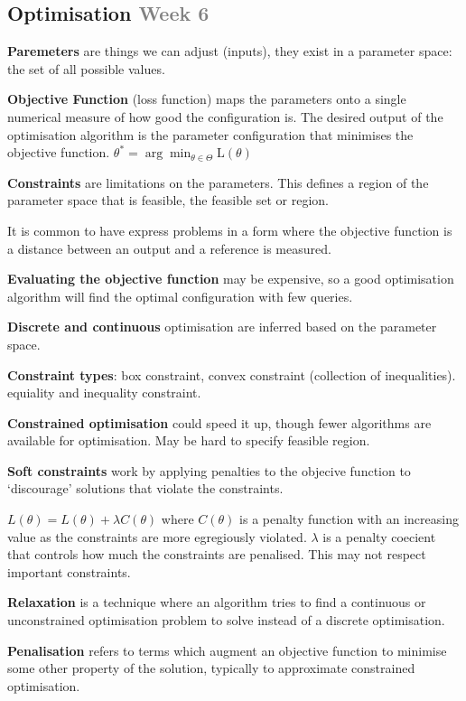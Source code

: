 \documentclass{article}
\begin{document}
\clearpage

\subsection*{Optimisation \small\textcolor{gray}{Week 6}}

\textbf{Paremeters} are things we can adjust (inputs), they exist in a parameter space: the set of all possible values.

\textbf{Objective Function} (loss function) maps the parameters onto a single numerical measure of how good the configuration is.
The desired output of the optimisation algorithm is the parameter configuration that minimises the objective function.
$\theta^* = \arg \min_{\theta \in \Theta} \text{L}(\theta)$

\textbf{Constraints} are limitations on the parameters. This defines a region of the parameter space that is feasible,
the feasible set or region.

It is common to have express problems in a form where the objective function is a distance between an output
and a reference is measured.

\textbf{Evaluating the objective function} may be expensive, so a good optimisation algorithm will find the optimal
configuration with few queries.

\textbf{Discrete and continuous} optimisation are inferred based on the parameter space.

\textbf{Constraint types}: box constraint, convex constraint (collection of inequalities).
equiality and inequality constraint.

\textbf{Constrained optimisation} could speed it up, though fewer algorithms are available for optimisation.
May be hard to specify feasible region.

\textbf{Soft constraints} work by applying penalties to the objecive function to `discourage' solutions that violate the constraints.

$ L(\theta) = L(\theta) + \lambda C(\theta) $ where $C(\theta)$ is a penalty function with an increasing value as the
constraints are more egregiously violated. $\lambda$ is a penalty coecient that controls how much the constraints are penalised.
This may not respect important constraints.

\textbf{Relaxation} is a technique where an algorithm tries to find a continuous or unconstrained
optimisation problem to solve instead of a discrete optimisation.

\textbf{Penalisation} refers to terms which augment an objective function to minimise some other property of
the solution, typically to approximate constrained optimisation.
\end{document}
